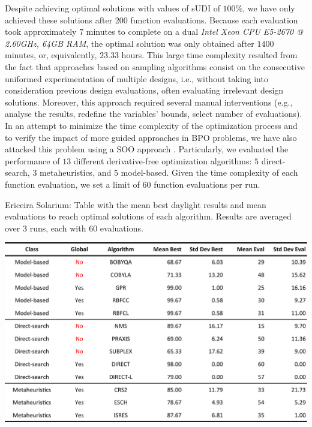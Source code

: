 Despite achieving optimal solutions with values of sUDI of $100\%$, we have only achieved these solutions after 200 function evaluations. Because each evaluation took approximately $7$ minutes to complete on a dual \textit{Intel Xeon CPU E5-2670 @ 2.60GHz, 64GB RAM}, the optimal solution was only obtained after $1400$ minutes, or, equivalently, $23.33$ hours. This large time complexity resulted from the fact that approaches based on sampling algorithms consist on the consecutive uniformed experimentation of multiple designs, i.e., without taking into consideration previous design evaluations, often evaluating irrelevant design solutions. Moreover, this approach required several manual interventions (e.g., analyse the results, redefine the variables' bounds, select number of evaluations). In an attempt to minimize the time complexity of the optimization process and to verify the impact of more guided approaches in \ac{BPO} problems, we have also attacked this problem using a \ac{SOO} approach \cite{Belem2018optimizeddesign}. Particularly, we evaluated the performance of $13$ different derivative-free optimization algorithms: $5$ direct-search, $3$ metaheuristics, and $5$ model-based. Given the time complexity of each function evaluation, we set a limit of $60$ function evaluations per run.

\begin{table}[htbp]
	\centering
	\caption[Ericeira Solarium: Mean best results and evaluations discriminated per algorithm]{Ericeira Solarium: Table with the mean best daylight results and mean evaluations to reach optimal solutions of each algorithm. Results are averaged over $3$ runs, each with $60$ evaluations.}
	\label{table:phase1results}
	\includegraphics[width=\textwidth]{tables_and_code/Ericeira_phase1_stats_v1.pdf}
\end{table}

